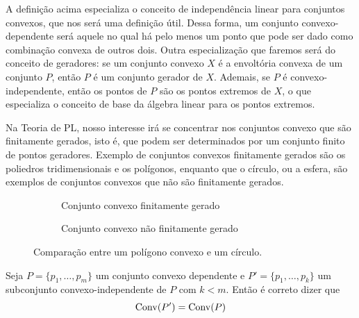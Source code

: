 A definição acima especializa o conceito de independência linear para conjuntos convexos,
que nos será uma definição útil. Dessa forma, um conjunto convexo-dependente será aquele 
no qual há pelo menos um ponto que pode ser dado como combinação convexa de outros dois.
Outra especialização que faremos será do conceito de geradores: se um conjunto convexo
$X$ é a envoltória convexa de um conjunto $P$, então $P$ é um conjunto gerador de $X$.
Ademais, se $P$ é convexo-independente, então os pontos de $P$ são os pontos extremos
de $X$, o que especializa o conceito de base da álgebra linear para os pontos extremos.

Na Teoria de PL, nosso interesse irá se concentrar nos conjuntos convexo que são
finitamente gerados, isto é, que podem ser determinados por um conjunto finito
de pontos geradores. Exemplo de conjuntos convexos finitamente gerados são
os poliedros tridimensionais e os polígonos, enquanto que o círculo, ou a esfera,
são exemplos de conjuntos convexos que não são finitamente gerados.

\begin{figure}[h]
\centering
\begin{subfigure}{0.45\textwidth}
	\centering
	\caption{Conjunto convexo finitamente gerado}
	\label{fig:poligono}
\end{subfigure}
\hfill
\begin{subfigure}{0.50\textwidth}
	\centering
	\caption{Conjunto convexo não finitamente gerado}
	\label{fig:circulo}
\end{subfigure}
\caption{Comparação entre um polígono convexo e um círculo.}
\end{figure} 

\begin{prop:redundancia}
	Seja $P = \{p_1, \ldots, p_m\}$ um conjunto convexo dependente e
	$P' = \{p_1, \ldots, p_k\}$ um subconjunto convexo-independente
	de $P$ com $k < m$. Então é correto dizer que
	\begin{equation*}
		\mathrm{Conv}(P') = \mathrm{Conv}(P) 
	\end{equation*} 
\end{prop:redundancia}

